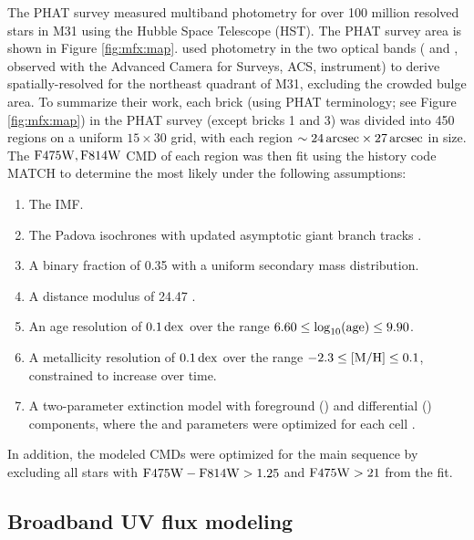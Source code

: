 \documentclass[iop, tighten]{emulateapj}
\begin{document}
The PHAT survey \citep{Dalcanton:2012} measured multiband photometry for over
100 million resolved stars in M31 using the Hubble Space Telescope (HST). The
PHAT survey area is shown in Figure \ref{fig:mfx:map}. \citet{Lewis:2014} used
photometry in the two optical bands (\acsb{} and \acsi{}, observed with the
Advanced Camera for Surveys, ACS, instrument) to derive spatially-resolved
 for the northeast quadrant of M31, excluding the crowded bulge area. To
summarize their work, each brick (using PHAT terminology; see Figure
\ref{fig:mfx:map}) in the PHAT survey (except bricks 1 and 3) was divided into
450 regions on a uniform $15 \times 30$ grid, with each region $\sim 24\,\mathrm{arcsec}
\times 27\,\mathrm{arcsec}$ in size. The $\mathrm{F475W},\mathrm{F814W}$ CMD of each region was then fit
using the \sfh{} history code MATCH \citep{Dolphin:2002} to determine the most
likely \sfh{} under the following assumptions:

\begin{enumerate}
\item The \citet{Kroupa:2001} IMF.
\item The Padova isochrones \citep{Marigo:2008} with updated asymptotic giant
    branch tracks \citep{Girardi:2010}.
\item A binary fraction of 0.35 with a uniform secondary mass distribution.
\item A distance modulus of 24.47 \citep{McConnachie:2005}.
\item An age resolution of $0.1\,\mathrm{dex}$ over the range $6.60 \le
    \log_{10}(\mathrm{age}) \le 9.90$.
\item A metallicity resolution of $0.1\,\mathrm{dex}$ over the range $-2.3 \le \mathrm{[M/H]} \le
    0.1$, constrained to increase over time.
\item A two-parameter extinction model with foreground (\avf{}) and
    differential (\dav{}) components, where the \avf{} and \dav{} parameters
    were optimized for each cell \citep[see also][]{Simones:2014}.
\end{enumerate}

In addition, the modeled CMDs were optimized for the main sequence by excluding
all stars with $\mathrm{F475W} - \mathrm{F814W} > 1.25$ and $\mathrm{F475W} > 21$ from the fit.



\subsection{Broadband UV flux modeling}\label{mfx:syntheticfluxmaps:fluxmod}
\end{document}
